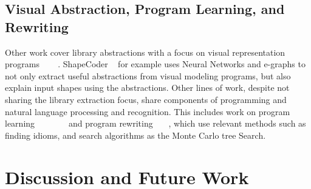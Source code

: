 \subsection{Visual Abstraction, Program Learning, and Rewriting}
Other work cover library abstractions with a focus on visual representation programs ~\cite{jones2023shapecoder} ~\cite{wang2021learningVisAbst}~\cite{Jones_2021}. ShapeCoder ~\cite{jones2023shapecoder}  for example uses Neural Networks and e-graphs to not only extract useful abstractions from visual modeling programs, but also explain input shapes using the abstractions. 
Other lines of work, despite not sharing the library extraction focus, share components of programming and natural language processing and recognition. This includes work on program learning~\cite{cropper2019playgol}~\cite{DBLP:journals/corr/abs-2004-09931refproginduc}~\cite{wong2022leveraging}  ~\cite{demo}~\cite{iyer2019learning} ~\cite{hocquette2024learning} and program rewriting~\cite{brandfonbrener2024verified} ~\cite{DBLP:conf/sat/NotzliRBNPBT19rewrite}~\cite{ganeshan2023improving}, which use relevant methods such as finding idioms, and search algorithms as the Monte Carlo tree Search. 




\section{Discussion and Future Work}






